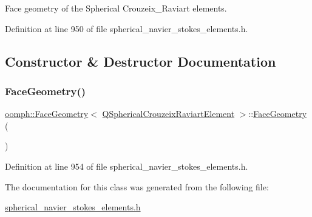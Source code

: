 Face geometry of the Spherical Crouzeix\+\_\+\+Raviart elements. 

Definition at line 950 of file spherical\+\_\+navier\+\_\+stokes\+\_\+elements.\+h.



\subsection{Constructor \& Destructor Documentation}
\mbox{\label{classoomph_1_1FaceGeometry_3_01QSphericalCrouzeixRaviartElement_01_4_abbe5e50ccb305d9be8efba383323eff0}} 
\subsubsection{\texorpdfstring{Face\+Geometry()}{FaceGeometry()}}
{\footnotesize\ttfamily \hyperlink{classoomph_1_1FaceGeometry}{oomph\+::\+Face\+Geometry}$<$ \hyperlink{classoomph_1_1QSphericalCrouzeixRaviartElement}{Q\+Spherical\+Crouzeix\+Raviart\+Element} $>$\+::\hyperlink{classoomph_1_1FaceGeometry}{Face\+Geometry} (\begin{DoxyParamCaption}{ }\end{DoxyParamCaption})\hspace{0.3cm}{\ttfamily [inline]}}



Definition at line 954 of file spherical\+\_\+navier\+\_\+stokes\+\_\+elements.\+h.



The documentation for this class was generated from the following file\+:\begin{DoxyCompactItemize}
\item 
\hyperlink{spherical__navier__stokes__elements_8h}{spherical\+\_\+navier\+\_\+stokes\+\_\+elements.\+h}\end{DoxyCompactItemize}

